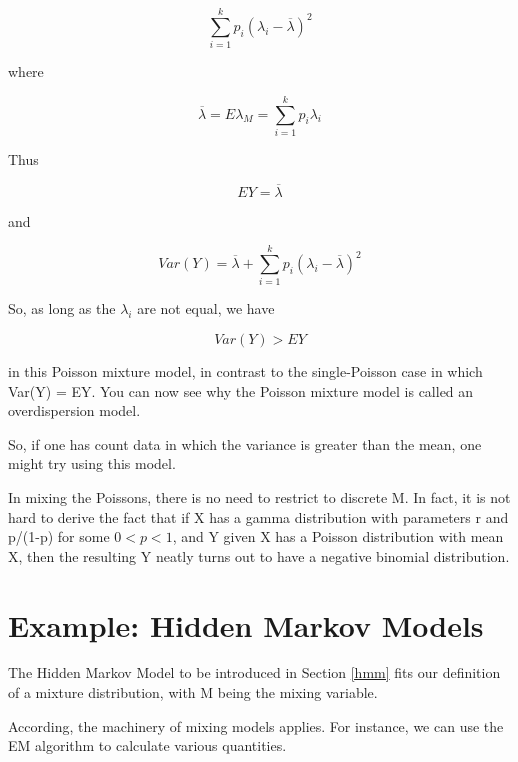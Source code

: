 \begin{equation}
\sum_{i=1}^k p_i (\lambda_i - \overline{\lambda})^2
\end{equation}

where 

\begin{equation}
\overline{\lambda} =  E\lambda_M = \sum_{i=1}^k p_i \lambda_i
\end{equation}

Thus

\begin{equation}
EY = \overline{\lambda}
\end{equation}

and

\begin{equation}
Var(Y) = \overline{\lambda} + 
\sum_{i=1}^k p_i (\lambda_i - \overline{\lambda})^2
\end{equation}

So, as long as the $\lambda_i$ are not equal, we have

\begin{equation}
Var(Y) > EY
\end{equation}

in this Poisson mixture model, in contrast to the single-Poisson case
in which Var(Y) = EY.  You can now see why the Poisson mixture model is
called an overdispersion model.

So, if one has count data in which the variance is greater than the
mean, one might try using this model.

In mixing the Poissons, there is no need to restrict to discrete M.  In
fact, it is not hard to derive the fact that if X has a gamma
distribution with parameters r and p/(1-p) for some $0 < p < 1$, and Y
given X has a Poisson distribution with mean X, then the resulting Y
neatly turns out to have a negative binomial distribution.

\section{Example:  Hidden Markov Models}

The Hidden Markov Model to be introduced in Section \ref{hmm} fits our
definition of a mixture distribution, with M being the mixing variable.

According, the machinery of mixing models applies.  For instance, we can
use the EM algorithm to calculate various quantities.

